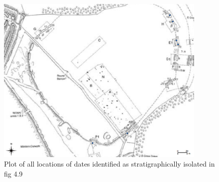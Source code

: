 \begin{figure}
\begin{center}
	\includegraphics[width=0.9\textwidth]{figures/central-isolated.png}
\end{center}
  \caption{Plot of all locations of dates identified as stratigraphically isolated in fig 4.9 \citep[140]{Whittle:2011kl}}
  \label{fig:central-isolated}
\end{figure}


